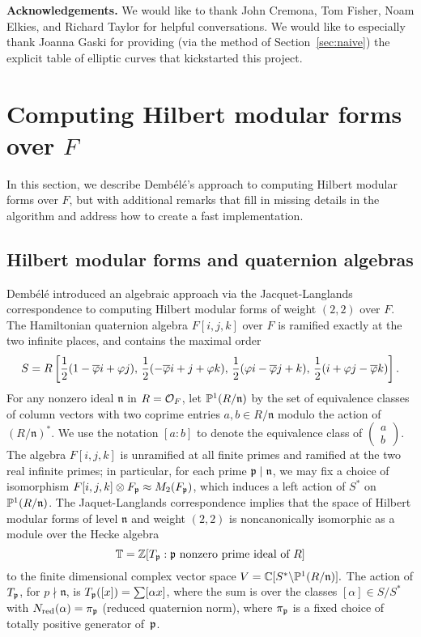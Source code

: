 \documentclass{amsart}
\newcommand{\n}{\mathfrak{n}}
\newcommand{\dembele}{Demb\'el{\'e}\xspace}
\begin{document}
{\bf Acknowledgements.} We would like to thank John Cremona, Tom
Fisher, Noam Elkies, and Richard Taylor for helpful conversations.  We
would like to especially thank Joanna Gaski for providing (via the
method of Section~\ref{sec:naive}) the explicit table of elliptic
curves that kickstarted this project.

\section{Computing Hilbert modular forms over $F$}\label{sec:hmf}

In this section, we describe \dembele's approach to computing Hilbert modular forms over
$F$, but with additional remarks that fill in missing details in the
algorithm and address how to create a fast implementation.

\subsection{Hilbert modular forms and quaternion 
algebras}\label{sec:dembele}
\dembele \cite{dembele:hilbert5} introduced an algebraic approach via
the Jacquet-Langlands correspondence to computing Hilbert modular
forms of weight $(2,2)$ over $F$.  The Hamiltonian quaternion algebra
$F[i,j,k]$ over $F$ is ramified exactly at the two infinite places,
and contains the maximal order
$$
 S = R\left[\frac{1}{2}(1-\overline{\varphi} i + \varphi j),\,
       \frac{1}{2}(-\overline{\varphi} i + j + \varphi k),\,
       \frac{1}{2}(\varphi i - \overline{\varphi} j + k), \,
       \frac{1}{2}(i + \varphi j - \overline{\varphi} k)\right].
$$
For any nonzero ideal $\n$ in $R=\mathcal{O}_F$,
let $\P^1(R/\n)$ by the set of equivalence classes of
 column vectors with two coprime entries $a,b \in R/\n$ modulo the
 action of $(R/\n)^*$.  We use the notation $[a:b]$
to denote the equivalence class of 
$\left(\begin{smallmatrix}a\\b\end{smallmatrix}\right)$.
The algebra $F[i,j,k]$ is unramified at all finite primes and ramified
at the two real infinite primes; in
particular, for each prime $\p\mid \n$, we may fix a choice of isomorphism
$F[i,j,k]\otimes F_{\mathfrak{p}} \approx M_2(F_{\mathfrak{p}})$, which induces a left
action of $S^*$ on $\P^1(R/\n)$. The Jaquet-Langlands correspondence implies that
the space of Hilbert modular forms of level $\n$ and weight $(2,2)$ is
noncanonically isomorphic as a module over the Hecke algebra
$$\mathbb{T}=\mathbb{Z}[T_{\mathfrak{p}} :  \mathfrak{p} \text{ nonzero prime ideal of }R]$$ 
to the finite dimensional complex vector space $ V = \C[S^* \backslash
\P^1(R/\n)].  $ The action of $T_{\mathfrak{p}}$, for $p\nmid \n$, is
$T_{\mathfrak{p}}([x]) = \sum [\alpha x]$, where the sum is over the classes
$[\alpha]\in S/S^*$ with $N_{\text{red}}(\alpha)=\pi_{\mathfrak{p}}$ (reduced quaternion norm),
where $\pi_{\mathfrak{p}}$ is a fixed choice of totally positive generator of~$\mathfrak{p}$.
\end{document}
